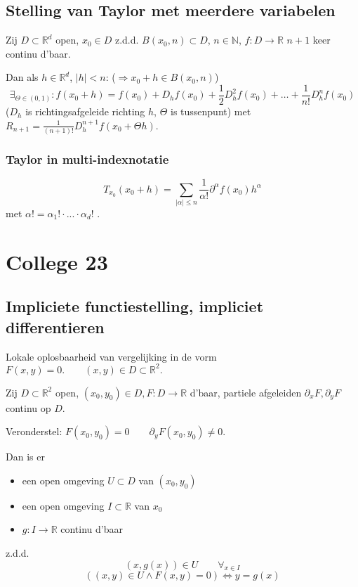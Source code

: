 \documentclass[a4paper]{exam}
\theoremstyle{definition}
\newcommand{\naturals}{\mathbb{N}}
\newcommand{\reals}{\mathbb{R}}
\begin{document}
		\subsection{Stelling van Taylor met meerdere variabelen}
			\theorem Zij  $D \subset \reals^d$ open, $x_0 \in D$ z.d.d. $B(x_0,n) \subset D$, $n\in \naturals$, $f:D\to \reals$ $n+1$ keer continu d'baar.
			
			Dan als $h \in \reals^d$, $ |h|<n $: ($\Rightarrow x_0+h \in B(x_0,n)$)
			\[ \exists_{\Theta \in (0,1)}:f(x_0+h) = f(x_0) + D_h f(x_0) + \frac{1}{2} D_h^2 f(x_0) + \dots + \frac{1}{n!} D_h^n f(x_0) \]
			($D_h$ is richtingsafgeleide richting $h$, $\Theta$ is tussenpunt)
			met $R_{n+1} = \frac{1}{(n+1)!}D_h^{n+1} f(x_0 + \Theta h)$.
		
			\subsubsection{Taylor in multi-indexnotatie}
				\[ T_{x_0} (x_0 + h) = \sum_{|\alpha|\le n} \frac{1}{\alpha !} \partial^\alpha f(x_0)h^\alpha \] met $ \alpha ! = \alpha_1 ! \cdot ... \cdot \alpha_d !$ .
		
	\newpage
	\section{College 23}
		\subsection{Impliciete functiestelling, impliciet differentieren}
			Lokale oplosbaarheid van vergelijking in de vorm $ F(x,y)=0. \qquad (x,y) \in D \subset \reals^2. $
			
			 Zij $D \subset \reals^2$ open, $ (x_0 , y_0 ) \in D, F:D \rightarrow \reals $ d'baar, partiele afgeleiden $ \partial_x F, \partial_y F $ continu op $ D $.
			
			Veronderstel: $ F(x_0, y_0) = 0 \qquad \partial_y F(x_0, y_0)\neq 0 $.
			
			Dan is er 
			\begin{itemize} 
				\item[] een open omgeving $ U \subset D $ van $ (x_0,y_0) $
				\item[] een open omgeving $ I \subset \reals $ van $ x_0 $
				\item[] $ g: I \rightarrow \reals $ continu d'baar 
			\end{itemize}
			z.d.d.
			\[ (x,g(x)) \in U \qquad \forall_{x \in I} \]
			\[ ((x,y) \in U \wedge F(x,y)=0) \Leftrightarrow y=g(x) \]
			
\end{document}
